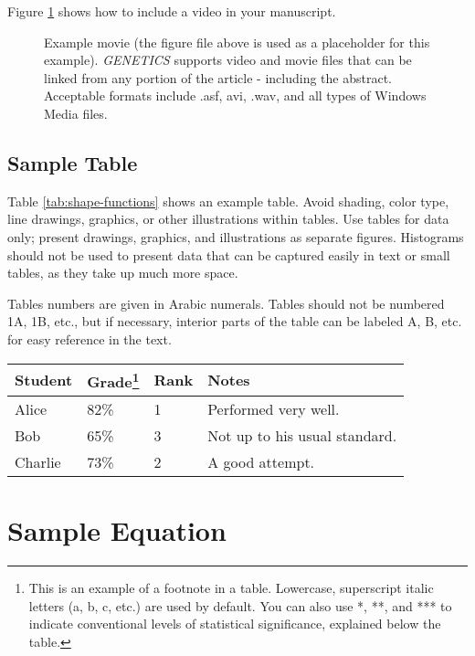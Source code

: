 \documentclass[9pt,twocolumn,twoside]{gsajnl}
\begin{document}
Figure \ref{video:spectrum} shows how to include a video in your manuscript.

\begin{figure}[htbp]
\centering
\caption{Example movie (the figure file above is used as a placeholder for this example). \textit{GENETICS} supports video and movie files that can be linked from any portion of the article - including the abstract. Acceptable formats include .asf, avi, .wav, and all types of Windows Media files.   
}%
\label{video:spectrum}
\end{figure}


\subsection*{Sample Table}

Table \ref{tab:shape-functions} shows an example table. Avoid shading, color type, line drawings, graphics, or other illustrations within tables. Use tables for data only; present drawings, graphics, and illustrations as separate figures. Histograms should not be used to present data that can be captured easily in text or small tables, as they take up much more space.  

Tables numbers are given in Arabic numerals. Tables should not be numbered 1A, 1B, etc., but if necessary, interior parts of the table can be labeled A, B, etc. for easy reference in the text.  


\begin{table*}[htbp]
\centering
\caption{\bf Students and their grades}
\begin{tableminipage}{\textwidth}
\begin{tabularx}{\textwidth}{XXXX}
\hline
Student & Grade\footnote{This is an example of a footnote in a table. Lowercase, superscript italic letters (a, b, c, etc.) are used by default. You can also use *, **, and *** to indicate conventional levels of statistical significance, explained below the table.} & Rank & Notes \\
\hline
Alice & 82\% & 1 & Performed very well.\\
Bob & 65\% & 3 & Not up to his usual standard.\\
Charlie & 73\% & 2 & A good attempt.\\
\hline
\end{tabularx}
  \label{tab:shape-functions}
\end{tableminipage}
\end{table*}

\section*{Sample Equation}
\end{document}
